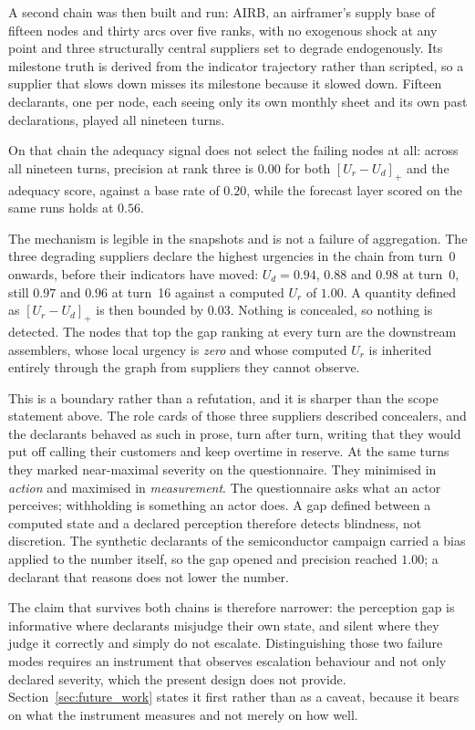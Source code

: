 A second chain was then built and run: AIRB, an airframer's supply base of fifteen nodes and
thirty arcs over five ranks, with no exogenous shock at any point and three structurally
central suppliers set to degrade endogenously. Its milestone truth is derived from the
indicator trajectory rather than scripted, so a supplier that slows down misses its milestone
because it slowed down. Fifteen declarants, one per node, each seeing only its own monthly
sheet and its own past declarations, played all nineteen turns.

On that chain the adequacy signal does not select the failing nodes at all: across all
nineteen turns, precision at rank three is $0.00$ for both $[U_r - U_d]_+$ and the adequacy
score, against a base rate of $0.20$, while the forecast layer scored on the same runs holds
at $0.56$.

The mechanism is legible in the snapshots and is not a failure of aggregation. The three
degrading suppliers declare the highest urgencies in the chain from turn~0 onwards, before
their indicators have moved: $U_d = 0.94$, $0.88$ and $0.98$ at turn~0, still $0.97$ and
$0.96$ at turn~16 against a computed $U_r$ of $1.00$. A quantity defined as $[U_r - U_d]_+$
is then bounded by $0.03$. Nothing is concealed, so nothing is detected. The nodes that top
the gap ranking at every turn are the downstream assemblers, whose local urgency is
\emph{zero} and whose computed $U_r$ is inherited entirely through the graph from suppliers
they cannot observe.

This is a boundary rather than a refutation, and it is sharper than the scope statement above.
The role cards of those three suppliers described concealers, and the declarants behaved as
such in prose, turn after turn, writing that they would put off calling their customers and
keep overtime in reserve. At the same turns they marked near-maximal severity on the
questionnaire. They minimised in \emph{action} and maximised in \emph{measurement}. The
questionnaire asks what an actor perceives; withholding is something an actor does. A gap
defined between a computed state and a declared perception therefore detects blindness, not
discretion. The synthetic declarants of the semiconductor campaign carried a bias applied to
the number itself, so the gap opened and precision reached $1.00$; a declarant that reasons
does not lower the number.

The claim that survives both chains is therefore narrower: the perception gap is informative
where declarants misjudge their own state, and silent where they judge it correctly and simply
do not escalate. Distinguishing those two failure modes requires an instrument that observes
escalation behaviour and not only declared severity, which the present design does not
provide. Section~\ref{sec:future_work} states it first rather than as a caveat, because it
bears on what the instrument measures and not merely on how well.

